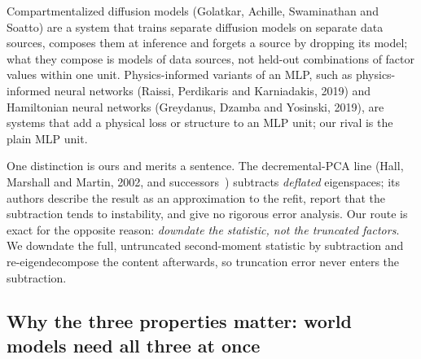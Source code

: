 \documentclass{article} %
\begin{document}
Compartmentalized diffusion models (Golatkar, Achille, Swaminathan and Soatto\nocite{golatkar2023training}) are a system that
trains separate diffusion models on separate data sources, composes them at inference and forgets a
source by dropping its model; what they compose is models of data sources, not held-out
combinations of factor values within one unit.
Physics-informed variants of an MLP, such as physics-informed neural networks (Raissi, Perdikaris
and Karniadakis, 2019\nocite{raissi2019physics}) and Hamiltonian neural networks (Greydanus, Dzamba and Yosinski, 2019\nocite{greydanus2019hamiltonian}), are
systems that add a physical loss or structure to an MLP unit; our rival is the plain MLP unit.

One distinction is ours and merits a sentence. The decremental-PCA
line (Hall, Marshall and Martin, 2002\nocite{hall2002adding}, and successors~\citep{jin2014evd,lee2021fast}) subtracts \emph{deflated} eigenspaces;
its authors describe the result as an approximation to the refit, report that the subtraction
tends to instability, and give no rigorous error analysis. Our route is exact for the opposite
reason: \emph{downdate the statistic, not the truncated factors}. We downdate the full,
untruncated second-moment statistic by subtraction and re-eigendecompose the content
afterwards, so truncation error never enters the subtraction.

\subsection{Why the three properties matter: world models need all three at once}
\label{sec:why}
\end{document}

